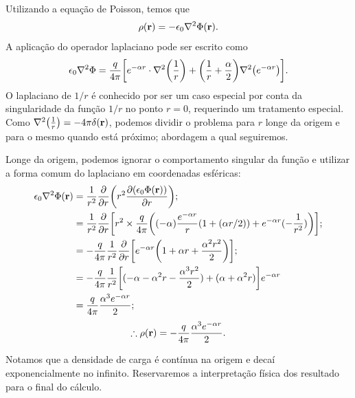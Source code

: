 Utilizando a equação de Poisson, temos que
\begin{equation*}
  \rho(\vb{r}) = - \epsilon_0 \laplacian{\Phi(\vb{r})}.
\end{equation*}
A aplicação do operador laplaciano pode ser escrito como
\[
  \epsilon_0 \laplacian{\Phi} = \frac{q}{4\pi}
  \qty[
    e^{-\alpha r} \cdot \laplacian{\qty(\frac{1}{r})} + \qty(\frac{1}{r} + \frac{\alpha}{2}) \laplacian{\qty(e^{-\alpha r})}
  ].
\]
O laplaciano de $1/r$ é conhecido por ser um caso especial por conta da singularidade da função $1/r$ no ponto $r = 0$, requerindo um tratamento especial. Como $\laplacian{\qty(\frac{1}{r})} = -4\pi \delta(\vb{r})$, podemos dividir o problema para $r$ longe da origem e para o mesmo quando está próximo; abordagem a qual seguiremos.

Longe da origem, podemos ignorar o comportamento singular da função e utilizar a forma comum do laplaciano em coordenadas esféricas:
\begin{align*}
  \epsilon_0 \laplacian{\Phi(\vb{r})}
  &= \frac{1}{r^2} \pdv{r}\qty(r^2 \pdv{(\epsilon_0 \Phi(\vb{r}))}{r});
  \\ &= \frac{1}{r^2} \pdv{r}\qty[ r^2 \times \frac{q}{4\pi}\qty( (-\alpha) \frac{e^{-\alpha r}}{r} (1 + (\alpha r/2)) + e^{-\alpha r} (-\frac{1}{r^2}) )  ];
  \\ &= -\frac{q}{4\pi} \frac{1}{r^2} \pdv{r} \qty[e^{-\alpha r} \qty(1 + \alpha r + \frac{\alpha^2 r^2}{2})];
  \\ &= -\frac{q}{4\pi} \frac{1}{r^2} \qty[(-\alpha - \alpha^2 r - \frac{\alpha^3 r^2}{2}) + (\alpha + \alpha^2 r)] e^{-\alpha r}
  \\ &= \frac{q}{4\pi} \frac{\alpha^3 e^{-\alpha r}}{2};
\end{align*}
\begin{equation*}
  \therefore \rho(\vb{r}) = - \frac{q}{4\pi} \frac{\alpha^3 e^{-\alpha r}}{2}.
\end{equation*}

Notamos que a densidade de carga é contínua na origem e decaí exponencialmente no infinito. Reservaremos a interpretação física dos resultado para o final do cálculo.


